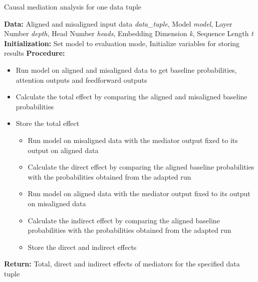 \documentclass{article}
\begin{document}
\renewcommand{\thealgorithm}{}
\begin{algorithm}
\caption{Causal mediation analysis for one data tuple}
\begin{algorithmic}
\STATE \textbf{Data:} Aligned and misaligned input data \textit{data\_tuple}, Model \textit{model}, Layer Number \textit{depth}, Head Number \textit{heads}, Embedding Dimension \textit{k}, Sequence Length \textit{t}
\STATE \textbf{Initialization:} Set model to evaluation mode, Initialize variables for storing results
\STATE \textbf{Procedure:}
\begin{itemize}
    \item Run model on aligned and misaligned data to get baseline probabilities, attention outputs and feedforward outputs
    \item Calculate the total effect by comparing the aligned and misaligned baseline probabilities
    \item Store the total effect
        \begin{itemize}
            \item Run model on misaligned data with the mediator output fixed to its output on aligned data
            \item Calculate the direct effect by comparing the aligned baseline probabilities with the probabilities obtained from the adapted run
            \item Run model on aligned data with the mediator output fixed to its output on misaligned data
            \item Calculate the indirect effect by comparing the aligned baseline probabilities with the probabilities obtained from the adapted run
            \item Store the direct and indirect effects
        \end{itemize}
    \ENDFOR
\end{itemize}

\STATE \textbf{Return:} Total, direct and indirect effects of mediators for the specified data tuple
\end{algorithmic}
\end{algorithm}
\end{document}
